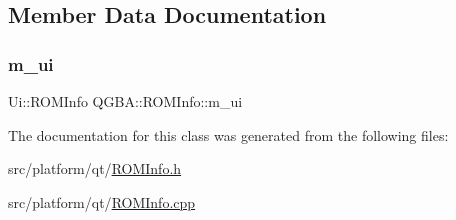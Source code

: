 \subsection{Member Data Documentation}
\mbox{\label{class_q_g_b_a_1_1_r_o_m_info_abe36da4ac8f24ab6ea087abd659280dc}} 
\subsubsection{\texorpdfstring{m\+\_\+ui}{m\_ui}}
{\footnotesize\ttfamily Ui\+::\+R\+O\+M\+Info Q\+G\+B\+A\+::\+R\+O\+M\+Info\+::m\+\_\+ui\hspace{0.3cm}{\ttfamily [private]}}



The documentation for this class was generated from the following files\+:\begin{DoxyCompactItemize}
\item 
src/platform/qt/\mbox{\hyperlink{_r_o_m_info_8h}{R\+O\+M\+Info.\+h}}\item 
src/platform/qt/\mbox{\hyperlink{_r_o_m_info_8cpp}{R\+O\+M\+Info.\+cpp}}\end{DoxyCompactItemize}
